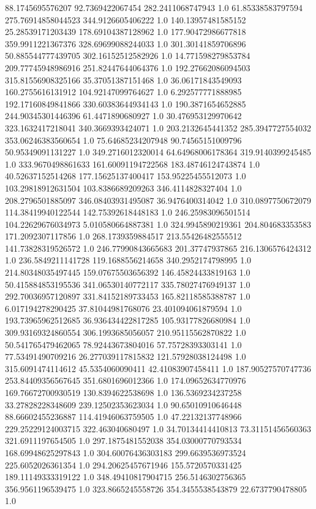 88.1745695576207	92.7369422067454	282.2411068747943	1.0
61.85338583797594	275.76914858044523	344.9126605406222	1.0
140.13957481585152	25.28539171203439	178.69104387128962	1.0
177.90472986677818	359.9911221367376	328.69699088244033	1.0
301.30141859706896	50.885544777439705	302.16152512582926	1.0
14.771598279853784	209.77745948986916	251.82447644064376	1.0
192.27662086094503	315.81556908325166	35.37051387151468	1.0
36.06171843549093	160.2755616131912	104.92147099764627	1.0
6.292577771888985	192.17160849841866	330.60383644934143	1.0
190.3871654652885	244.90345301446396	61.4471890680927	1.0
30.476953129970642	323.1632417218041	340.3669393424071	1.0
203.2132645441352	285.3947727554032	353.06246383560654	1.0
75.64685234207948	90.74565151009796	50.95349091131227	1.0
349.2716012320014	64.64968006178364	319.9140399245485	1.0
333.9670498861633	161.60091194722568	183.48746124743874	1.0
40.52637152514268	177.15625137400417	153.95225455512073	1.0
103.29818912631504	103.8386689209263	346.4114828327404	1.0
208.2796501885097	346.08403931495087	36.9476400314042	1.0
310.0897750672079	114.38419940122544	142.75392618448183	1.0
246.25983096501514	104.22629676034973	5.010580664887381	1.0
324.9945890219361	204.804683353583	171.2092307117856	1.0
268.1739359884517	213.55426482555512	141.73828319526572	1.0
246.77990843665683	201.37747937865	216.1306576424312	1.0
236.5849211141728	119.1688556214658	340.2952174798995	1.0
214.80348035497445	159.07675503656392	146.45824433819163	1.0
50.415884853195536	341.06530140772117	335.78027476949137	1.0
292.70036957120897	331.84152189733453	165.82118585388787	1.0
6.017194278290425	37.81044981768076	23.401094061879594	1.0
193.73965962512685	36.936434422817285	105.93177826680984	1.0
309.93169324860554	306.1993685056057	210.95115562870822	1.0
50.541765479462065	78.92443673804016	57.75728393303141	1.0
77.53491490709216	26.277039117815832	121.57928038124498	1.0
315.6091474114612	45.5354060090411	42.41083907458411	1.0
187.90527570747736	253.84409356567645	351.6801696012366	1.0
174.09652634770976	169.76672700930519	130.8394622538698	1.0
136.5369234237258	33.27828228348609	239.12502353623034	1.0
90.65010910646448	88.66602455236887	114.41946063759505	1.0
47.22132137748966	229.25229124003715	322.463040680497	1.0
34.70134414410813	73.31151456560363	321.6911197654505	1.0
297.1875481552038	354.03000770793534	168.69948625297843	1.0
304.60076436303183	299.6639536973524	225.6052026361354	1.0
294.20625457671946	155.5720570331425	189.11149333319122	1.0
348.49410817904715	256.5146302756365	356.9561196539475	1.0
323.8665245558726	354.3455538543879	22.6737790478805	1.0
